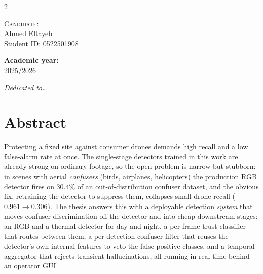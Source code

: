 \documentclass[12pt,a4paper,oneside,openany]{book}
\begin{document}
\begin{titlepage}
\begin{minipage}[t]{1\textwidth}
\begin{multicols}{2}
         \begin{flushright}
            {\normalsize{\textsc{Candidate:}}{\normalsize\vspace{1mm}
            \\ \normalsize{Ahmed Eltayeb}\\
            \vspace{2mm}
            \normalsize{Student ID: 0522501908}}} \\
         \end{flushright}
    \end{multicols}
\end{minipage}

\begin{center}
    \vspace{3mm}
    {\normalsize{\textbf{Academic year:}}{\normalsize\vspace{1mm}
    \\ \normalsize{2025/2026}}}
\end{center}

\end{titlepage}

\onehalfspacing

\cleardoublepage
\thispagestyle{empty}
\begin{flushright}
\itshape Dedicated to\ldots %
\end{flushright}
\cleardoublepage

\chapter*{Abstract}

Protecting a fixed site against consumer drones demands high recall and a low false-alarm rate at once. The single-stage detectors trained in this work are already strong on ordinary footage, so the open problem is narrow but stubborn: in scenes with aerial \emph{confusers} (birds, airplanes, helicopters) the production RGB detector fires on $30.4\%$ of an out-of-distribution confuser dataset, and the obvious fix, retraining the detector to suppress them, collapses small-drone recall ($0.961 \to 0.306$). The thesis answers this with a deployable detection \emph{system} that moves confuser discrimination off the detector and into cheap downstream stages: an RGB and a thermal detector for day and night, a per-frame trust classifier that routes between them, a per-detection confuser filter that reuses the detector's own internal features to veto the false-positive classes, and a temporal aggregator that rejects transient hallucinations, all running in real time behind an operator GUI.
\end{document}
